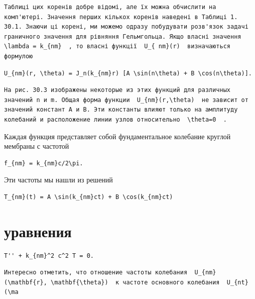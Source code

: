 \documentclass[
  ukrainian,
]{article}
\begin{document}
\begin{verbatim}
Таблиці цих коренів добре відомі, але їх можна обчислити на комп'ютері. Значення перших кількох коренів наведені в Таблиці 1. 30.1. Знаючи ці корені, ми можемо одразу побудувати розв'язок задачі граничного значення для рівняння Гельмгольца. Якщо власні значення  \lambda = k_{nm}  , то власні функції  U_{ nm}(r)  визначаються формулою
\end{verbatim}

\begin{verbatim}
U_{nm}(r, \theta) = J_n(k_{nm}r) [A \sin(n\theta) + B \cos(n\theta)].
\end{verbatim}

\begin{verbatim}
На рис. 30.3 изображены некоторые из этих функций для различных значений n и m. Общая форма функции  U_{nm}(r,\theta)  не зависит от значений констант A и B. Эти константы влияют только на амплитуду колебаний и расположение линии узлов относительно  \theta=0  .
\end{verbatim}

Каждая функция представляет собой фундаментальное колебание круглой
мембраны с частотой

\begin{verbatim}
f_{nm} = k_{nm}c/2\pi.
\end{verbatim}

Эти частоты мы нашли из решений

\begin{verbatim}
T_{nm}(t) = A \sin(k_{nm}ct) + B \cos(k_{nm}ct)
\end{verbatim}

\section{уравнения}\label{ux443ux440ux430ux432ux43dux435ux43dux438ux44f}

\begin{verbatim}
T'' + k_{nm}^2 c^2 T = 0.
\end{verbatim}

\begin{verbatim}
Интересно отметить, что отношение частоты колебания  U_{nm}(\mathbf{r}, \mathbf{\theta})  к частоте основного колебания  U_{nt}(\ma
\end{verbatim}
\end{document}
